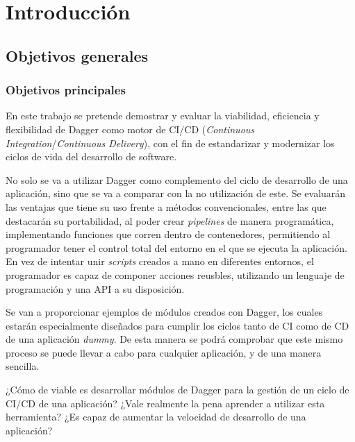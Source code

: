\chapter{Introducción}


\section{Objetivos generales}


\subsection*{Objetivos principales}

En este trabajo se pretende demostrar y evaluar la viabilidad, eficiencia y flexibilidad de Dagger\cite{dagger} como motor de CI/CD (\textit{Continuous Integration}/\textit{Continuous Delivery})\cite{ci,cd}, con el fin de estandarizar y modernizar los ciclos de vida del desarrollo de software.

No solo se va a utilizar Dagger como complemento del ciclo de desarrollo de una aplicación, sino que se va a comparar con la no utilización de este. Se evaluarán las ventajas que tiene su uso frente a métodos convencionales, entre las que destacarán su portabilidad, al poder crear \textit{pipelines} de manera programática, implementando funciones que corren dentro de contenedores, permitiendo al programador tener el control total del entorno en el que se ejecuta la aplicación. En vez de intentar unir \textit{scripts} creados a mano en diferentes entornos, el programador es capaz de componer acciones reusbles, utilizando un lenguaje de programación y una API a su disposición.

Se van a proporcionar ejemplos de módulos creados con Dagger, los cuales estarán especialmente diseñados para cumplir los ciclos tanto de CI  como de CD  de una aplicación \textit{dummy}. De esta manera se podrá comprobar que este mismo proceso se puede llevar a cabo para cualquier aplicación, y de una manera sencilla.

¿Cómo de viable es desarrollar módulos de Dagger para la gestión de un ciclo de CI/CD de una aplicación? ¿Vale realmente la pena aprender a utilizar esta herramienta? ¿Es capaz de aumentar la velocidad de desarrollo de una aplicación?

